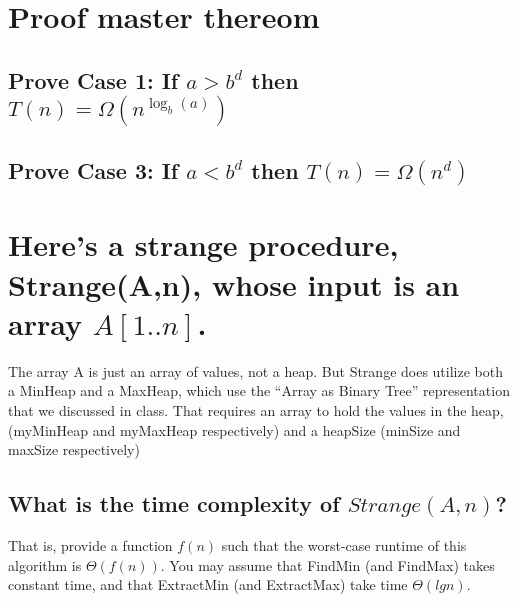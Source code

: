 \documentclass[a4paper]{article}
\begin{document}
\section{Proof master thereom}
\subsection{Prove Case 1: If $a>b^d$ then $T(n)=\Omega\left(n^{ \log _b(a)}\right)$}
\subsection{Prove Case 3: If $a<b^d$ then $T(n)=\Omega\left(n^d\right)$}
\section{Here's a strange procedure, Strange(A,n), whose input is an array $A[1..n]$.  }
The array A is just an array of values, not a heap. But Strange does utilize both a MinHeap and a MaxHeap, which use the “Array as Binary Tree” representation that we discussed in class. That requires an array to 
hold the values in the heap, (myMinHeap and myMaxHeap respectively) and a 
heapSize (minSize and maxSize respectively)

\subsection{What is the time complexity of $Strange(A, n)$? }
That is, provide a function $f(n)$
such that the worst-case runtime of this algorithm is $\Theta( f(n) )$. You may assume that FindMin (and FindMax) takes constant time, and that ExtractMin (and 
ExtractMax) take time $\Theta(lg n)$.
\end{document}
